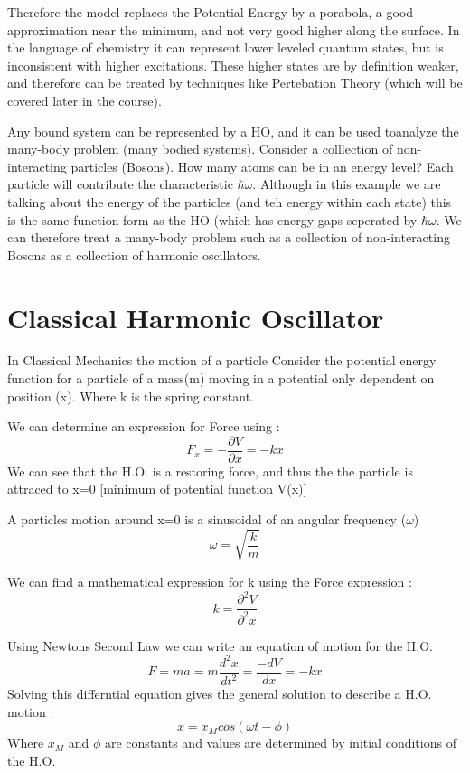 \documentclass{article}
\newcommand{\be}{\begin{equation}}
\newcommand{\ee}{\end{equation}}
\begin{document}
Therefore the model replaces the Potential Energy by a porabola, a good approximation near the minimum, and not very good higher along the surface.
In the language of chemistry it can represent lower leveled quantum states, but is inconsistent with higher excitations. 
These higher states are by definition weaker, and therefore can be treated by techniques like Pertebation Theory (which will be covered later in the course). 

Any bound system can be represented by a HO, and it can be used toanalyze the many-body problem (many bodied systems).
Consider a colllection of non-interacting particles (Bosons).
How many atoms can be in an energy level?
Each particle will contribute the characteristic $\hbar \omega$.
Although in this example we are talking about the energy of the particles (and teh energy within each state) this is the same function  form as the HO (which has energy gaps seperated by $\hbar \omega$.
We can therefore treat a many-body problem such as a collection of non-interacting Bosons as a collection of harmonic oscillators. 

\section{Classical Harmonic Oscillator}
In Classical Mechanics the motion of a particle 
Consider the potential energy function for a particle of a mass(m) moving in a potential only dependent on position (x). Where k is the spring constant. 

We can determine an expression for Force using : 
\be
F_x=-\frac{\partial V}{\partial x} = -kx
\ee
We can see that the H.O. is a restoring force, and thus the the particle is attraced to x=0 [minimum of potential function V(x)]

A particles motion around x=0 is a sinusoidal of an angular frequency ($\omega$) 
\be
\omega=\sqrt{\frac{k}{m}}
\ee

We can find a mathematical expression for k using the Force expression : 
\be
k=\frac{\partial^2V}{\partial^2x}
\ee

Using Newtons Second Law we can write an equation of motion for the H.O.
\be
F=ma=m\frac{d^2x}{dt^2}=\frac{-dV}{dx}=-kx
\ee
Solving this differntial equation gives the general solution to describe a H.O. motion : 
\be
x=x_Mcos(\omega t - \phi)
\ee
Where $x_M$ and $\phi$ are constants and values are determined by initial conditions of the H.O. 

\end{document}
